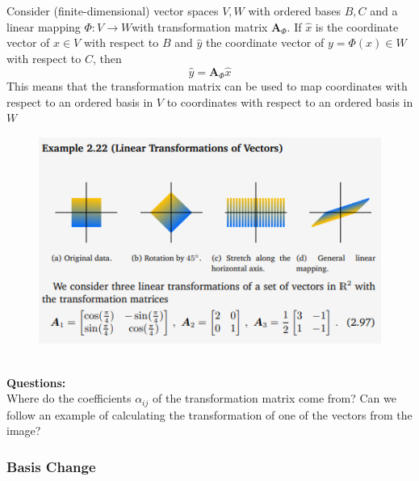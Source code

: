 Consider (finite-dimensional) vector spaces $V,W$ with ordered bases $B,C$ and a linear mapping $\Phi: V \longrightarrow W $with transformation matrix $\mathbf{A}_{\Phi}$. If $\hat{x}$ is the coordinate vector of $x \in V$ with respect to $B$ and $\hat{y}$ the coordinate vector of $y = \Phi(x) \in W$ with respect to $C$, then
\[
    \hat{y} = \mathbf{A}_{\Phi}\hat{x}    
\]
This means that the transformation matrix can be used to map coordinates with respect to an ordered basis in $V$ to coordinates with respect to an ordered basis in $W$
\begin{figure}[htbp]
    \centering
    \includegraphics[width=12cm]{Mathematical Background/example-transformation-matrix-application.png}
\end{figure}\\
\textbf{Questions:}\\
Where do the coefficients $\alpha_{ij}$ of the transformation matrix come from? Can we follow an example of calculating the transformation of one of the vectors from the image?
\subsubsection*{Basis Change}

